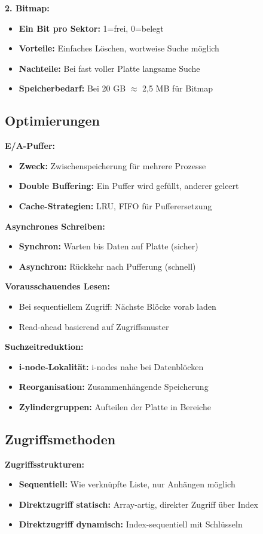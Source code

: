 \documentclass[9pt,a4paper]{extarticle}
\begin{document}
\begin{multicols*}{2}
\textbf{2. Bitmap:}
\begin{itemize}
\item \textbf{Ein Bit pro Sektor:} 1=frei, 0=belegt
\item \textbf{Vorteile:} Einfaches Löschen, wortweise Suche möglich
\item \textbf{Nachteile:} Bei fast voller Platte langsame Suche
\item \textbf{Speicherbedarf:} Bei 20 GB $\approx$ 2,5 MB für Bitmap
\end{itemize}

\subsection{Optimierungen}
\textbf{E/A-Puffer:}
\begin{itemize}
\item \textbf{Zweck:} Zwischenspeicherung für mehrere Prozesse
\item \textbf{Double Buffering:} Ein Puffer wird gefüllt, anderer geleert
\item \textbf{Cache-Strategien:} LRU, FIFO für Pufferersetzung
\end{itemize}

\textbf{Asynchrones Schreiben:}
\begin{itemize}
\item \textbf{Synchron:} Warten bis Daten auf Platte (sicher)
\item \textbf{Asynchron:} Rückkehr nach Pufferung (schnell)
\end{itemize}

\textbf{Vorausschauendes Lesen:}
\begin{itemize}
\item Bei sequentiellem Zugriff: Nächste Blöcke vorab laden
\item Read-ahead basierend auf Zugriffsmuster
\end{itemize}

\textbf{Suchzeitreduktion:}
\begin{itemize}
\item \textbf{i-node-Lokalität:} i-nodes nahe bei Datenblöcken
\item \textbf{Reorganisation:} Zusammenhängende Speicherung
\item \textbf{Zylindergruppen:} Aufteilen der Platte in Bereiche
\end{itemize}

\subsection{Zugriffsmethoden}
\textbf{Zugriffsstrukturen:}
\begin{itemize}
\item \textbf{Sequentiell:} Wie verknüpfte Liste, nur Anhängen möglich
\item \textbf{Direktzugriff statisch:} Array-artig, direkter Zugriff über Index
\item \textbf{Direktzugriff dynamisch:} Index-sequentiell mit Schlüsseln
\end{itemize}


\end{multicols*}
\end{document}
